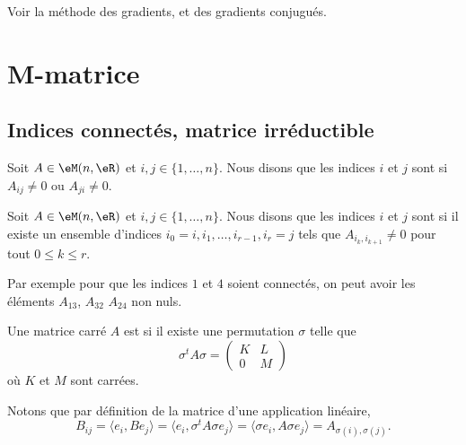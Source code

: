 Voir la méthode des gradients, et des gradients conjugués.

\section{M-matrice}

\subsection{Indices connectés, matrice irréductible}

\begin{definition}
    Soit \( A\in \eM(n,\eR)\) et \( i,j\in\{ 1,\ldots, n \}\). Nous disons que les indices \( i\) et \( j\) sont  si \( A_{ij}\neq 0\) ou \( A_{ji}\neq 0\).
\end{definition}

\begin{definition}      \label{DEFooADAAooAAMscc}
    Soit \( A\in \eM(n,\eR)\) et \( i,j\in\{ 1,\ldots, n \}\). Nous disons que les indices \( i\) et \( j\) sont  si il existe un ensemble d'indices \( i_0=i,i_1,\ldots, i_{r-1},i_r=j   \) tels que \( A_{i_k,i_{k+1}}\neq 0\) pour tout \( 0\leq k\leq r\).
\end{definition}

Par exemple pour que les indices \( 1\) et \( 4\) soient connectés, on peut avoir les éléments \( A_{13}\), \( A_{32}\) \( A_{24}\) non nuls.

\begin{definition}      \label{DEFooXIREooQtlzkO}
    Une matrice carré \( A\) est  si il existe une permutation \( \sigma\) telle que 
    \begin{equation}        \label{EQooGGZKooUyXSJk}
        \sigma^tA\sigma=\begin{pmatrix}
            K    &   L    \\ 
            0    &   M    
        \end{pmatrix}
    \end{equation}
    où \( K\) et \( M\) sont carrées.
\end{definition}
Notons que par définition de la matrice d'une application linéaire,
\begin{equation}
    B_{ij}= \langle e_i, Be_j\rangle =\langle e_i, \sigma^tA\sigma e_j\rangle =\langle \sigma e_i, A\sigma e_j\rangle =A_{\sigma(i),\sigma(j)}.
\end{equation}

